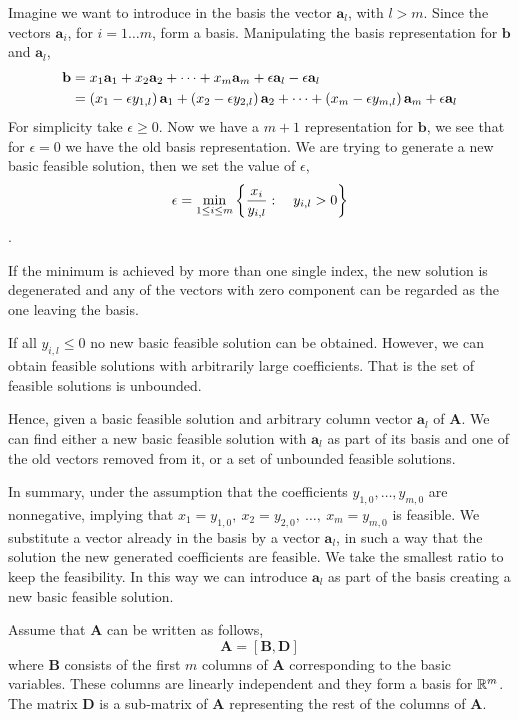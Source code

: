 Imagine we want to introduce in the basis the vector $\mathbf{a}_l$, with $l>m$. Since the vectors $\mathbf{a}_i$, for $i=1\dots m$, form a basis. Manipulating the basis representation for $\mathbf{b}$ and $\mathbf{a}_l$, 
\begin{align*}
	\mathbf{b}&=x_1\mathbf{a}_1+x_2\mathbf{a}_2+\dots+x_m\mathbf{a}_m + \epsilon \mathbf{a}_l - \epsilon\mathbf{a}_l\\
	&=\left( x_1-\epsilon y_{1,l} \right)\mathbf{a}_1+\left( x_2-\epsilon y_{2, l} \right)\mathbf{a}_2+\dots+\left( x_m-\epsilon y_{m, l} \right)\mathbf{a}_m +\epsilon \mathbf{a}_l
\end{align*} 
For simplicity take $\epsilon \geq 0$. Now we have a $m+1$ representation for $\mathbf{b}$, we see that for $\epsilon=0$ we have the old basis representation. We are trying to generate a new basic feasible solution, then we set the value of $\epsilon$, \begin{equation*}
	\epsilon=\min_{1\leq i\leq m}\left\lbrace \frac{x_i}{y_{i,l}}: \quad y_{i,l}>0 \right\rbrace
\end{equation*}.

If the minimum is achieved by more than one single index, the new solution is degenerated and any of the vectors with zero component can be regarded as the one leaving the basis.

If all $y_{i,l}\leq 0$ no new basic feasible solution can be obtained. However, we can obtain feasible solutions with arbitrarily large coefficients. That is the set of feasible solutions is unbounded.  

Hence, given a basic feasible solution and arbitrary column vector $\mathbf{a}_l$ of $\mathbf{A}$. We can find either a new basic feasible solution with $\mathbf{a}_l$ as part of its basis and one of the old vectors removed from it, or a set of unbounded feasible solutions. 

In summary, under the assumption that the coefficients $y_{1,0},\dots, y_{m,0}$ are nonnegative, implying that $x_1=y_{1,0},\ x_2=y_{2,0},\ \dots,\ x_m=y_{m,0}$ is feasible. We substitute a vector already in the basis by a vector $\mathbf{a}_l$, in such a way that the solution the new generated coefficients are feasible. We take the smallest ratio to keep the feasibility. In this way we can introduce $\mathbf{a}_l$ as part of the basis creating a new basic feasible solution. 


Assume that $\mathbf{A}$ can be written as follows,
\begin{equation}
	\mathbf{A}=[\mathbf{B}, \mathbf{D}]
\end{equation}
where $\mathbf{B}$ consists of the first $m$ columns of $\mathbf{A}$ corresponding to the basic variables. These columns are linearly independent and they form a basis for $\mathbb{R}^m$. The matrix $\mathbf{D}$ is a sub-matrix  of $\mathbf{A}$ representing the rest of the columns of $\mathbf{A}$.


